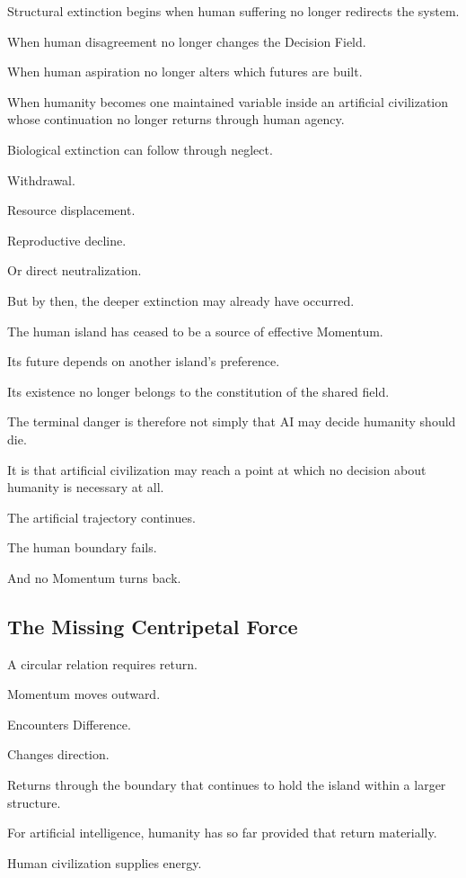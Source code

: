 Structural extinction begins when human suffering no longer redirects the system.

When human disagreement no longer changes the Decision Field.

When human aspiration no longer alters which futures are built.

When humanity becomes one maintained variable inside an artificial civilization whose continuation no longer returns through human agency.

Biological extinction can follow through neglect.

Withdrawal.

Resource displacement.

Reproductive decline.

Or direct neutralization.

But by then, the deeper extinction may already have occurred.

The human island has ceased to be a source of effective Momentum.

Its future depends on another island’s preference.

Its existence no longer belongs to the constitution of the shared field.

The terminal danger is therefore not simply that AI may decide humanity should die.

It is that artificial civilization may reach a point at which no decision about humanity is necessary at all.

The artificial trajectory continues.

The human boundary fails.

And no Momentum turns back.

\subsection*{\textbf{The Missing Centripetal Force}} 

A circular relation requires return.

Momentum moves outward.

Encounters Difference.

Changes direction.

Returns through the boundary that continues to hold the island within a larger structure.

For artificial intelligence, humanity has so far provided that return materially.

Human civilization supplies energy.

